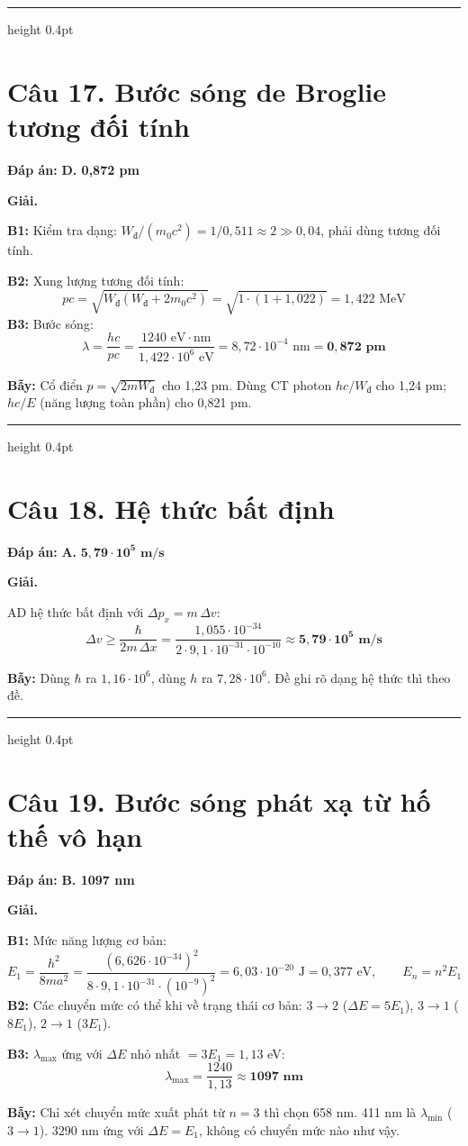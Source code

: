 \documentclass[11pt,a4paper]{article}
\renewcommand{\boldsymbol}[1]{\symbf{#1}}
\newcommand{\Wd}{W_{\text{đ}}}
\newcommand{\Cau}[2]{\par\Needspace{7\baselineskip}\section*{Câu #1. #2}}
\newcommand{\DapAn}[1]{\textbf{Đáp án:} #1\par}
\newcommand{\Bay}[1]{\par\textbf{Bẫy:} #1\par}
\newcommand{\PhanCachBai}{%
  \par\Needspace{7\baselineskip}%
  \addvspace{6pt}%
  {\color{black!40}\hrule height 0.4pt}%
  \nobreak\vspace{7pt}\nobreak
}
\begin{document}
\PhanCachBai
\Cau{17}{Bước sóng de Broglie tương đối tính}
\DapAn{\textbf{D. 0,872 pm}}

\textbf{Giải.}

\textbf{B1:} Kiểm tra dạng: $\Wd/(m_0c^2)=1/0{,}511\approx2\gg0{,}04$, phải dùng tương đối tính.

\textbf{B2:} Xung lượng tương đối tính:
\begin{equation*}
    pc=\sqrt{\Wd(\Wd+2m_0c^2)}=\sqrt{1\cdot(1+1{,}022)}=1{,}422\text{ MeV}
\end{equation*}
\textbf{B3:} Bước sóng:
\begin{equation*}
    \lambda=\frac{hc}{pc}=\frac{1240\text{ eV}\cdot\text{nm}}{1{,}422\cdot10^{6}\text{ eV}}=8{,}72\cdot10^{-4}\text{ nm}=\boldsymbol{0{,}872\text{ pm}}
\end{equation*}
\Bay{Cổ điển $p=\sqrt{2m\Wd}$ cho 1,23 pm. Dùng CT photon $hc/\Wd$ cho 1,24 pm; $hc/E$ (năng lượng toàn phần) cho 0,821 pm.}

\PhanCachBai
\Cau{18}{Hệ thức bất định}
\DapAn{\textbf{A.} $\boldsymbol{5{,}79\cdot10^{5}\text{ m/s}}$}

\textbf{Giải.}

AD hệ thức bất định với $\Delta p_x=m\,\Delta v$:
\begin{equation*}
    \Delta v\ge\frac{\hbar}{2m\,\Delta x}=\frac{1{,}055\cdot10^{-34}}{2\cdot9{,}1\cdot10^{-31}\cdot10^{-10}}\approx\boldsymbol{5{,}79\cdot10^{5}\text{ m/s}}
\end{equation*}
\Bay{Dùng $\hbar$ ra $1{,}16\cdot10^{6}$, dùng $h$ ra $7{,}28\cdot10^{6}$. Đề ghi rõ dạng hệ thức thì theo đề.}

\PhanCachBai
\Cau{19}{Bước sóng phát xạ từ hố thế vô hạn}
\DapAn{\textbf{B. 1097 nm}}

\textbf{Giải.}

\textbf{B1:} Mức năng lượng cơ bản:
\begin{equation*}
    E_1=\frac{h^2}{8ma^2}=\frac{(6{,}626\cdot10^{-34})^2}{8\cdot9{,}1\cdot10^{-31}\cdot(10^{-9})^2}=6{,}03\cdot10^{-20}\text{ J}=0{,}377\text{ eV},\qquad E_n=n^2E_1
\end{equation*}
\textbf{B2:} Các chuyển mức có thể khi về trạng thái cơ bản: $3\to2$ ($\Delta E=5E_1$), $3\to1$ ($8E_1$), $2\to1$ ($3E_1$).

\textbf{B3:} $\lambda_{\max}$ ứng với $\Delta E$ nhỏ nhất $=3E_1=1{,}13$ eV:
\begin{equation*}
    \lambda_{\max}=\frac{1240}{1{,}13}\approx\boldsymbol{1097\text{ nm}}
\end{equation*}
\Bay{Chỉ xét chuyển mức xuất phát từ $n=3$ thì chọn 658 nm. 411 nm là $\lambda_{\min}$ ($3\to1$). 3290 nm ứng với $\Delta E=E_1$, không có chuyển mức nào như vậy.}
\end{document}

